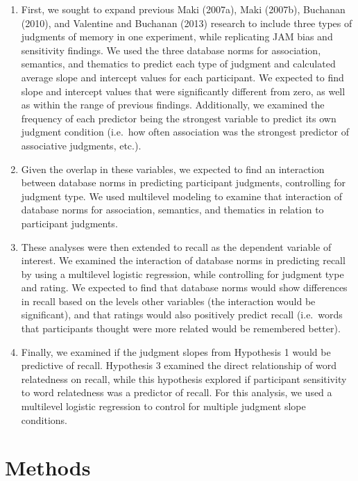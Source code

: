 \documentclass[english,man]{apa6}
\theoremstyle{definition}
\theoremstyle{definition}
\theoremstyle{remark}
\begin{document}
\begin{enumerate}
\def\labelenumi{\arabic{enumi})}
\item
  First, we sought to expand previous Maki (2007a), Maki (2007b),
  Buchanan (2010), and Valentine and Buchanan (2013) research to include
  three types of judgments of memory in one experiment, while
  replicating JAM bias and sensitivity findings. We used the three
  database norms for association, semantics, and thematics to predict
  each type of judgment and calculated average slope and intercept
  values for each participant. We expected to find slope and intercept
  values that were significantly different from zero, as well as within
  the range of previous findings. Additionally, we examined the
  frequency of each predictor being the strongest variable to predict
  its own judgment condition (i.e.~how often association was the
  strongest predictor of associative judgments, etc.).
\item
  Given the overlap in these variables, we expected to find an
  interaction between database norms in predicting participant
  judgments, controlling for judgment type. We used multilevel modeling
  to examine that interaction of database norms for association,
  semantics, and thematics in relation to participant judgments.
\item
  These analyses were then extended to recall as the dependent variable
  of interest. We examined the interaction of database norms in
  predicting recall by using a multilevel logistic regression, while
  controlling for judgment type and rating. We expected to find that
  database norms would show differences in recall based on the levels
  other variables (the interaction would be significant), and that
  ratings would also positively predict recall (i.e.~words that
  participants thought were more related would be remembered better).
\item
  Finally, we examined if the judgment slopes from Hypothesis 1 would be
  predictive of recall. Hypothesis 3 examined the direct relationship of
  word relatedness on recall, while this hypothesis explored if
  participant sensitivity to word relatedness was a predictor of recall.
  For this analysis, we used a multilevel logistic regression to control
  for multiple judgment slope conditions.
\end{enumerate}

\section{Methods}\label{methods}
\end{document}
